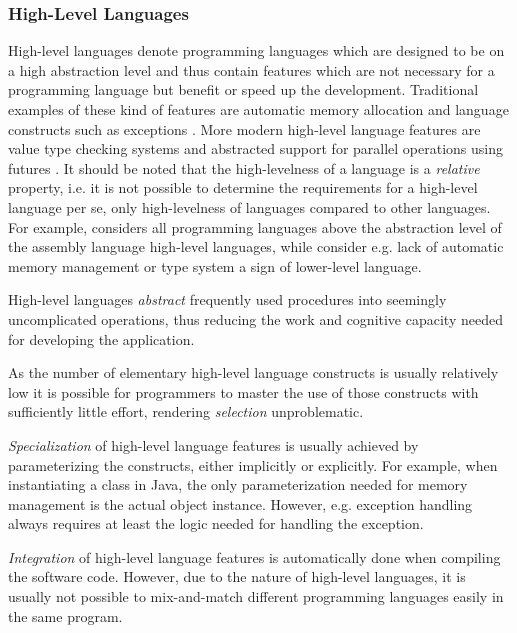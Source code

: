 \subsubsection{High-Level Languages}
High-level languages denote programming languages which are designed to be on a high abstraction level and thus contain features which are not necessary for a programming language but benefit or speed up the development. Traditional examples of these kind of features are automatic memory allocation \citep{krueger_software_1992} and language constructs such as exceptions \citep{mitchell_concepts_2003}. More modern high-level language features are value type checking systems and abstracted support for parallel operations using futures \citep{totoo_haskell_2012}. It should be noted that the high-levelness of a language is a \emph{relative} property, i.e. it is not possible to determine the requirements for a high-level language per se, only high-levelness of languages compared to other languages. For example, \citet{krueger_software_1992} considers all programming languages above the abstraction level of the assembly language high-level languages, while \citet{carro_high-level_2006} consider e.g. lack of automatic memory management or type system a sign of lower-level language.

High-level languages \emph{abstract} frequently used procedures into seemingly uncomplicated operations, thus reducing the work and cognitive capacity needed for developing the application. \citep[chap.~3]{krueger_software_1992}

As the number of elementary high-level language constructs is usually relatively low it is possible for programmers to master the use of those constructs with sufficiently little effort, rendering \emph{selection} unproblematic. \citep[chap.~3]{krueger_software_1992}

\emph{Specialization} of high-level language features is usually achieved by parameterizing the constructs, either implicitly or explicitly. For example, when instantiating a class in Java, the only parameterization needed for memory management is the actual object instance. However, e.g. exception handling always requires at least the logic needed for handling the exception. \citep[chap.~3]{krueger_software_1992}

\emph{Integration} of high-level language features is automatically done when compiling the software code. However, due to the nature of high-level languages, it is usually not possible to mix-and-match different programming languages easily in the same program. \citep[chap.~3]{krueger_software_1992}

